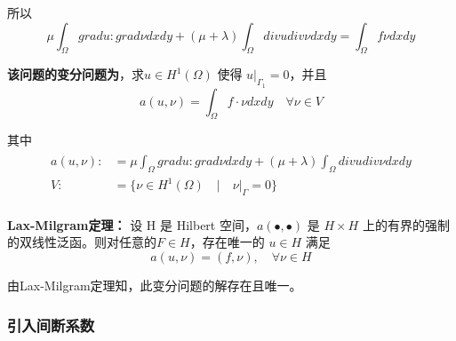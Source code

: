 \documentclass[a4paper,UTF8,titlepage]{ctexart}
\begin{document}
所以
$$
\mu \int_{\Omega} grad u : grad \nu dxdy + (\mu +\lambda) \int_{\Omega} div u div \nu  dxdy = \int_{\Omega} f \nu dxdy
$$

\textbf{该问题的变分问题为}，求$u \in H^1(\Omega)$ 使得 $u |_{\Gamma_1} = 0$，并且
\begin{equation}
a(u,\nu) = \int_{\Omega} f \cdot \nu dxdy \quad \forall \nu \in V
\label{bffc}
\end{equation}
\par
其中
$$
\begin{matrix}
	\begin{aligned}
		a(u,\nu) :&= \mu \int_{\Omega} grad u : grad \nu dxdy + (\mu +\lambda) \int_{\Omega} div u div \nu  dxdy \\  
		
		V :&= \{ \nu \in H^1(\Omega) \quad | \quad \nu |_{\Gamma} = 0 \}
	\end{aligned}
\end{matrix}
$$

\textbf{Lax-Milgram定理\textsuperscript{\cite{brenner2008mathematical}}：} 设 H 是 Hilbert 空间，$a(\bullet,\bullet)$ 是 $H \times H$ 上的有界的强制的双线性泛函。则对任意的$F \in H$，存在唯一的 $u \in H$ 满足
$$
	a(u,\nu) = (f,\nu), \quad \forall \nu \in H 
$$

由Lax-Milgram定理知，此变分问题的解存在且唯一。




%
%	
%	

\subsubsection{引入间断系数}
\end{document}
